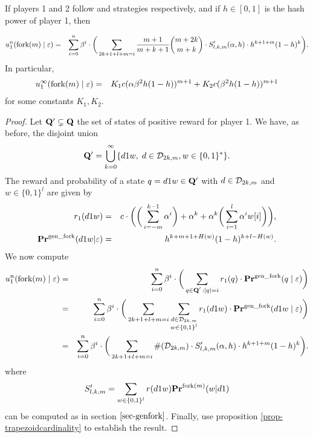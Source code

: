 \begin{myprop*}
If players 1 and 2 follow \mfork and \df strategies respectively, and if $h\in [0,1]$ is the hash power of player 1, then

\begin{eqnarray*}
	u_1^n(\text{\rm fork($m$)} \mid \varepsilon) & = & \sum_{i=0}^{n}\beta^{i} \cdot  \bigg(\sum_{2k+1+l+m=i} \frac{m+1}{m+k+1}{m+2k\choose m+k} \cdot S'_{l,k,m}(\alpha,h)\cdot h^{k+1+m}(1-h)^{k}\bigg).
\end{eqnarray*}
In particular,
\begin{eqnarray*}
	u_1^\infty(\text{\rm fork($m$)} \mid \varepsilon) & = & K_1 c(\alpha\beta^2h(1-h))^{m+1}+K_2 c(\beta^2h(1-h))^{m+1}
\end{eqnarray*}
for some constants $K_1,K_2$.

\end{myprop*}
\begin{proof}
	Let $\mathbf{Q}'\subsetneq \mathbf{Q}$ the set of states of positive reward for player 1. We have, as before, the disjoint union
	$$\mathbf{Q}' = \bigcup_{k=0}^\infty \{d1w,\; d\in\mathcal{D}_{2k,m}, w\in\{0,1\}^\ast\}.$$
	The reward and probability of a state $q=d1w\in \mathbf{Q}'$ with $d\in\mathcal{D}_{2k,m}$ and $w\in\{0,1\}^l$ are given by
\begin{eqnarray*}
	r_1(d1w) &=& c\cdot \bigg(\bigg(\sum_{i=-m}^{k-1}\alpha^i \bigg)+\alpha^{k}+\alpha^{k}\bigg(\sum_{i=1}^{l}\alpha^i w[i]\bigg)\bigg),\\
	\mathbf{Pr}^{\text{\rm gen\_fork}}(d1w|\varepsilon) &=& h^{k+m+1+H(w)}(1-h)^{k+l-H(w)}.
\end{eqnarray*} 
We now compute
\begin{eqnarray*}
	u_1^n(\text{\rm fork($m$)} \mid \varepsilon) & = & \sum_{i=0}^{n}\beta^{i} \cdot  \bigg(\sum_{\substack{q \in \mathbf{Q}' \,: |q| = i}} r_1(q) \cdot 
	\mathbf{Pr}^{\text{\rm gen\_fork}}(q \mid \varepsilon)\bigg)\\
								   & = & \sum_{i=0}^{n}\beta^{i} \cdot  \bigg(\sum_{2k+1+l+m=i}\sum_{\substack{d\in \mathcal{D}_{2k,m}\\w\in\{0,1\}^l}} r_1(d1w) \cdot 
	\mathbf{Pr}^{\text{\rm gen\_fork}}(d1w \mid \varepsilon)\bigg)\\
								   & = & \sum_{i=0}^{n}\beta^{i} \cdot  \bigg(\sum_{2k+1+l+m=i} \#(\mathcal{D}_{2k,m})\cdot S'_{l,k,m}(\alpha,h)\cdot h^{k+1+m}(1-h)^{k}\bigg).
\end{eqnarray*}
where
$$S'_{l,k,m}=\sum_{w\in\{0,1\}^l}r(d1w)\mathbf{Pr}^{\text{\rm fork($m$)}}(w|d1)$$
can be computed as in section $\ref{sec-genfork}$. Finally, use proposition \ref{prop-trapezoidcardinality} to establish the result.
\end{proof}
